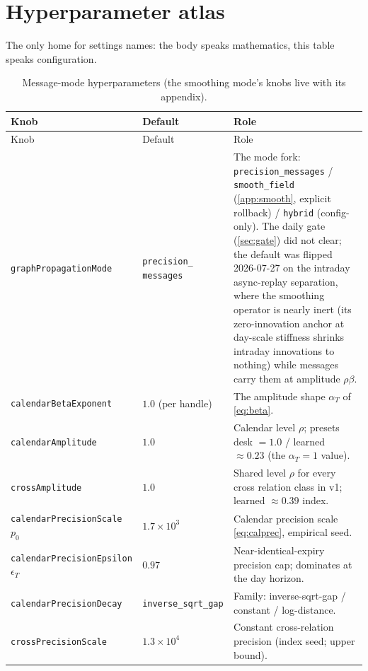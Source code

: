 \documentclass[11pt]{article}
\begin{document}
\appendix
\section{Hyperparameter atlas}
\label{app:atlas}

The only home for settings names: the body speaks mathematics, this
table speaks configuration.

\begingroup
\small
\begin{longtable}{p{}p{}p{}}
\caption{Message-mode hyperparameters (the smoothing mode's knobs live
with its appendix).}\label{tab:atlas}\\
\toprule Knob & Default & Role\\ \midrule
\endfirsthead \toprule Knob & Default & Role\\ \midrule \endhead
\texttt{graphPropagationMode} & \texttt{precision\_\allowbreak
messages} & The mode
fork: \texttt{precision\_messages} / \texttt{smooth\_field}
(\cref{app:smooth}, explicit rollback) / \texttt{hybrid} (config-only).
The daily gate (\cref{sec:gate}) did not clear; the default was flipped
2026-07-27 on the intraday async-replay separation, where the smoothing
operator is nearly inert (its zero-innovation anchor at day-scale
stiffness shrinks intraday innovations to nothing) while messages carry
them at amplitude $\rho\beta$.\\
\texttt{calendarBetaExponent} & $1.0$ (per handle) & The amplitude
shape $\alpha_T$ of \eqref{eq:beta}.\\
\texttt{calendarAmplitude} & $1.0$ & Calendar level $\rho$; presets
desk $=1.0$ / learned $\approx0.23$ (the $\alpha_T{=}1$ value).\\
\texttt{crossAmplitude} & $1.0$ & Shared level $\rho$ for every cross
relation class in v1; learned $\approx0.39$ index.\\
\texttt{calendarPrecisionScale} $p_0$ & $1.7\times10^3$ & Calendar
precision scale \eqref{eq:calprec}, empirical seed.\\
\texttt{calendarPrecisionEpsilon} $\epsilon_T$ & $0.97$ &
Near-identical-expiry precision cap; dominates at the day horizon.\\
\texttt{calendarPrecisionDecay} & \texttt{inverse\_sqrt\_gap} & Family:
inverse-sqrt-gap / constant / log-distance.\\
\texttt{crossPrecisionScale} & $1.3\times10^4$ & Constant
cross-relation precision (index seed; upper bound).\\

\end{longtable}
\end{document}
